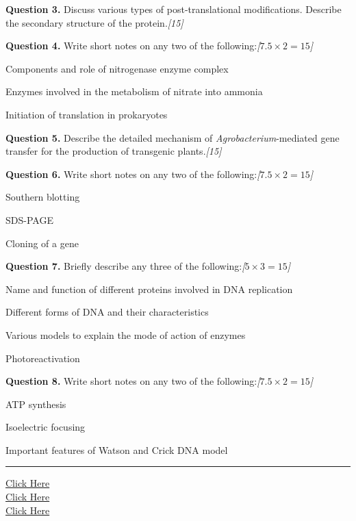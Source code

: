 \documentclass[11pt,a4paper]{article}
\newcommand{\pts}[1]{\hfill   \textit{[#1]}}
\begin{document}
\noindent   \textbf{Question 3.} Discuss various types of post-translational modifications. Describe the secondary structure of the protein.\pts{15}

\medskip


\noindent   \textbf{Question 4.} Write short notes on any two of the following:\pts{$7.5  \times 2 = 15$}

\begin{parts}
  \item Components and role of nitrogenase enzyme complex
  \item Enzymes involved in the metabolism of nitrate into ammonia
  \item Initiation of translation in prokaryotes
\end{parts}

\medskip


\noindent   \textbf{Question 5.} Describe the detailed mechanism of   \textit{Agrobacterium}-mediated gene transfer for the production of transgenic plants.\pts{15}

\medskip


\noindent   \textbf{Question 6.} Write short notes on any two of the following:\pts{$7.5  \times 2 = 15$}

\begin{parts}
  \item Southern blotting
  \item SDS-PAGE
  \item Cloning of a gene
\end{parts}

\medskip


\noindent   \textbf{Question 7.} Briefly describe any three of the following:\pts{$5  \times 3 = 15$}

\begin{parts}
  \item Name and function of different proteins involved in DNA replication
  \item Different forms of DNA and their characteristics
  \item Various models to explain the mode of action of enzymes
  \item Photoreactivation
\end{parts}

\medskip


\noindent   \textbf{Question 8.} Write short notes on any two of the following:\pts{$7.5  \times 2 = 15$}

\begin{parts}
  \item ATP synthesis
  \item Isoelectric focusing
  \item Important features of Watson and Crick DNA model
\end{parts}

\vfill
\rule{\linewidth}{0.4pt}

\begin{center}\small
\href{https://bhu-exam.vercel.app/}{Click Here}\\[4pt]\href{https://me-aryan.vercel.app/}{Click Here}\\[4pt]\href{https://quashan-me.vercel.app/}{Click Here}
\end{center}
\end{document}
